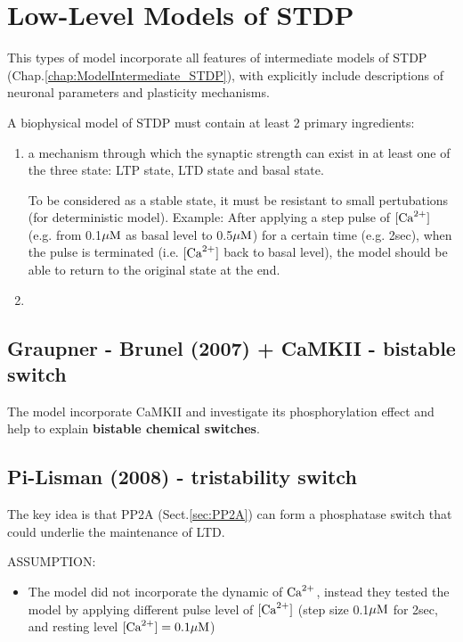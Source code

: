 \chapter{Low-Level Models of STDP}
\label{chap:Model-LowLevel_STDP}

This types of model incorporate all features of intermediate models of STDP
(Chap.\ref{chap:ModelIntermediate_STDP}), with explicitly include descriptions
of neuronal parameters and plasticity mechanisms.

A biophysical model of STDP must contain at least 2 primary ingredients:
\begin{enumerate}
  \item a mechanism through which the synaptic strength can exist in at least
  one of the three state: LTP state, LTD state and basal state.

To be considered as a stable state, it must be resistant to small pertubations
(for deterministic model). Example: After applying a step pulse of $[{\text{Ca}^{2+}}]$
(e.g. from 0.1${\mu\text{M}}$ as basal level to 0.5${\mu\text{M}}$) for a certain time (e.g.
2sec), when the pulse is terminated (i.e. $[{\text{Ca}^{2+}}]$ back to basal level), the
model should be able to return to the original state at the end.
  
  \item 
\end{enumerate}



\section{Graupner - Brunel (2007) + CaMKII - bistable switch}
\label{sec:Graupner-Brunel-2007}


The model incorporate CaMKII and investigate its phosphorylation effect
and help to explain {\bf bistable chemical switches}.

\section{Pi-Lisman (2008) - tristability switch}
\label{sec:Pi-Lisman-2008}


The key idea is that PP2A (Sect.\ref{sec:PP2A}) can form a phosphatase switch
that could underlie the maintenance of LTD.

ASSUMPTION:
\begin{itemize}
  \item The model did not incorporate the dynamic of ${\text{Ca}^{2+}}$, instead they tested
  the model by applying different pulse level of $[{\text{Ca}^{2+}}]$ (step size 0.1${\mu\text{M}}$
  for 2sec, and resting level $[{\text{Ca}^{2+}}]=0.1{\mu\text{M}}$)
  
  
\end{itemize}

